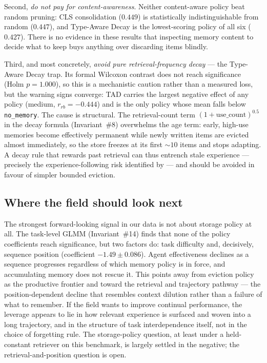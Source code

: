 Second, \emph{do not pay for content-awareness}. Neither content-aware policy beat
random pruning: CLS consolidation ($0.449$) is statistically indistinguishable from
random ($0.447$), and Type-Aware Decay is the lowest-scoring policy of all six
($0.427$). There is no evidence in these results that inspecting memory content to
decide what to keep buys anything over discarding items blindly.

Third, and most concretely, \emph{avoid pure retrieval-frequency decay} --- the
Type-Aware Decay trap. Its formal Wilcoxon contrast does not reach significance
(Holm $p = 1.000$), so this is a mechanistic caution rather than a measured loss,
but the warning signs converge: TAD carries the largest negative effect of any
policy (medium, $r_{rb} = -0.444$) and is the only policy whose mean falls below
\texttt{no\_memory}. The cause is structural. The retrieval-count term
$(1+\text{use\_count})^{0.5}$ in the decay formula (Invariant~\#8) overwhelms the
age term: early, high-use memories become effectively permanent while newly written
items are evicted almost immediately, so the store freezes at its first
$\sim\!10$ items and stops adapting. A decay rule that rewards past retrieval can
thus entrench stale experience --- precisely the experience-following risk
identified by \cite{xiong2025} --- and should be avoided in favour of simpler
bounded eviction.

\subsection{Where the field should look next}

The strongest forward-looking signal in our data is not about storage policy at all.
The task-level GLMM (Invariant~\#14) finds that none of the policy coefficients
reach significance, but two factors do: task difficulty and, decisively, sequence
position (coefficient $-1.49 \pm 0.086$). Agent effectiveness declines as a sequence
progresses regardless of which memory policy is in force, and accumulating memory
does not rescue it. This points away from eviction policy as the productive frontier
and toward the retrieval and trajectory pathway --- the position-dependent decline
that resembles context dilution rather than a failure of what to remember. If the
field wants to improve continual performance, the leverage appears to lie in how
relevant experience is surfaced and woven into a long trajectory, and in the
structure of task interdependence itself, not in the choice of forgetting rule. The
storage-policy question, at least under a held-constant retriever on this benchmark,
is largely settled in the negative; the retrieval-and-position question is open.


